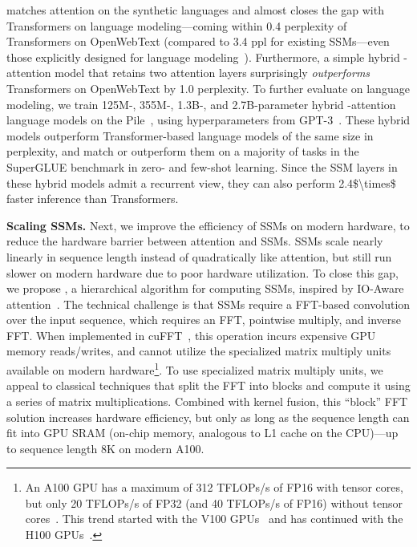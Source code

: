 \hthree matches attention on the synthetic languages and almost closes the gap with Transformers on language modeling---coming within \num{0.4} perplexity of Transformers on OpenWebText (compared to \num{3.4} ppl for existing SSMs---even those explicitly designed for language modeling~\citep{mehta2022long}).
Furthermore, a simple hybrid \hthree-attention model that retains two attention layers surprisingly \textit{outperforms} Transformers on OpenWebText by \num{1.0} perplexity.
To further evaluate \hthree on language modeling, we train 125M-, 355M-, 1.3B-, and 2.7B-parameter hybrid \hthree-attention language models on the Pile~\citep{gao2020pile}, using hyperparameters from GPT-3~\citep{brown2020language}.
These hybrid models outperform Transformer-based language models of the same size in perplexity, and match or outperform them on a majority of tasks in the SuperGLUE benchmark in zero- and few-shot learning.
Since the SSM layers in these hybrid models admit a recurrent view, they can also perform \num{2.4$\times$} faster inference than Transformers.

\textbf{Scaling SSMs.}
Next, we improve the efficiency of SSMs on modern hardware, to reduce the hardware barrier between attention and SSMs.
SSMs scale nearly linearly in sequence length instead of quadratically like attention, but still run slower on modern hardware due to poor hardware utilization.
To close this gap, we propose \fastfft, a hierarchical algorithm for computing SSMs, inspired by IO-Aware attention~\citep{dao2022flashattention}.
The technical challenge is that SSMs require a FFT-based convolution over the input sequence, which requires an FFT, pointwise multiply, and inverse FFT.
When implemented in cuFFT~\citep{cufft}, this operation incurs expensive GPU memory reads/writes, and cannot utilize the specialized matrix multiply units available on modern hardware\footnote{An A100 GPU has a maximum of 312 TFLOPs/s of FP16 with
tensor cores, but only 20 TFLOPs/s of FP32 (and 40 TFLOPs/s of FP16) without
tensor cores~\citep{nvidia2020nvidia}. This trend started with the V100 GPUs~\citep{nvidia2017nvidia} and has continued with the
H100 GPUs~\citep{nvidia2022nvidia}.}.
To use specialized matrix multiply units, we appeal to classical techniques that split the FFT into blocks and compute it using a series of matrix multiplications.
Combined with kernel fusion, this ``block'' FFT solution increases hardware efficiency, but only as long as the sequence length can fit into GPU SRAM (on-chip memory, analogous to L1 cache on the CPU)---up to sequence length 8K on modern A100.

